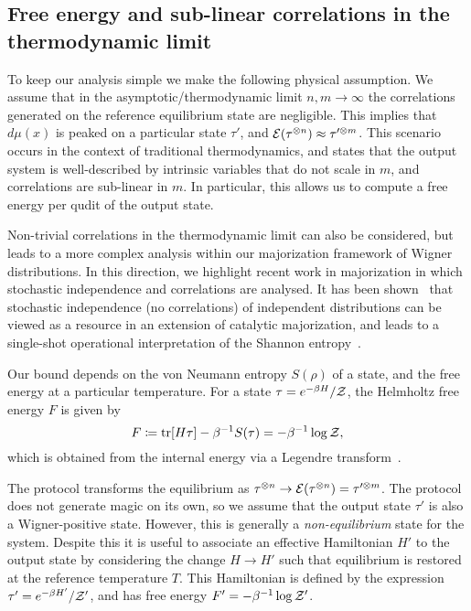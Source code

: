 \documentclass[
onecolumn,
superscriptaddress
]{revtex4-1}
\renewcommand{\tr}{{\rm{tr}}}
\def\Z{{\cal Z}}
\def\E{{\cal E}}
\begin{document}
\subsection*{Free energy and sub-linear correlations in the thermodynamic limit}

To keep our analysis simple we make the following physical assumption. We assume that in the asymptotic/thermodynamic limit $n,m \rightarrow \infty$ the correlations generated on the reference equilibrium state are negligible. This implies that $d\mu(x)$ is peaked on a particular state $\tau'$, and $\E(\tau^{\otimes n}) \approx \tau'^{\otimes m}$. This scenario occurs in the context of traditional thermodynamics, and states that the output system is well-described by intrinsic variables that do not scale in $m$, and correlations are sub-linear in $m$. In particular, this allows us to compute a free energy per qudit of the output state. 

Non-trivial correlations in the thermodynamic limit can also be considered, but leads to a more complex analysis within our majorization framework of Wigner distributions. In this direction, we highlight recent work in majorization in which stochastic independence and correlations are analysed. It has been shown~\cite{muller_2015} that stochastic independence (no correlations) of independent distributions can be viewed as a resource in an extension of catalytic majorization, and leads to a single-shot operational interpretation of the Shannon entropy~\cite{muller_2016, muller_2019}.

Our bound depends on the von Neumann entropy $S(\rho)$ of a state, and the free energy at a particular temperature.
For a state $\tau = e^{-\beta H}/\Z$, the Helmholtz free energy $F$ is given by
\begin{equation}
	F \coloneqq \tr[H \tau] - \beta^{-1}S(\tau) = -\beta^{-1}\log \Z,
\end{equation}
which is obtained from the internal energy via a Legendre transform~\cite{Pathria_1997}.

The protocol transforms the equilibrium as $\tau^{\otimes n} \rightarrow \E(\tau^{\otimes n}) = \tau^{\prime \otimes m}$.  The protocol does not generate magic on its own, so we assume that the output state $\tau'$ is also a Wigner-positive state. However, this is generally a \emph{non-equilibrium} state for the system. Despite this it is useful to associate an effective Hamiltonian $H'$ to the output state by considering the change $H \rightarrow H'$ such that equilibrium is restored at the reference temperature $T$. This Hamiltonian is defined by the expression $\tau' = e^{-\beta H'}/\Z'$, and has free energy $F' = -\beta^{-1} \log \Z'$.
\end{document}

